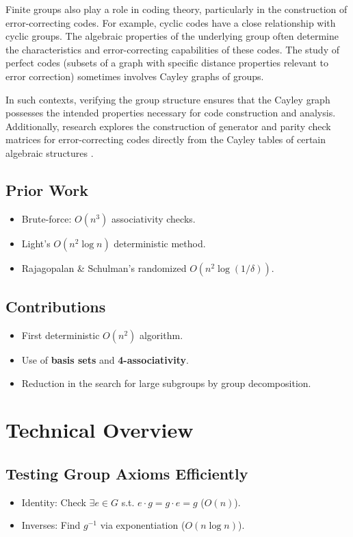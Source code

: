 \documentclass[sigconf]{acmart}
\begin{document}
Finite groups also play a role in coding theory, particularly in the construction of error-correcting codes. For example, cyclic codes have a close 
relationship with cyclic groups. The algebraic properties of the underlying group often determine the characteristics and error-correcting
capabilities of these codes. The study of perfect codes (subsets of a graph with specific distance properties relevant to error correction)
sometimes involves Cayley graphs of groups.

In such contexts, verifying the group structure ensures that the Cayley graph possesses
the intended properties necessary for code construction and analysis. Additionally, research explores the construction of generator
and parity check matrices for error-correcting codes directly from the Cayley tables of certain algebraic structures \cite{zurekCodingTheory}.

\subsection{Prior Work}
\begin{itemize}
    \item Brute-force: \( O(n^3) \) associativity checks.
    \item Light's \( O(n^2 \log n) \) deterministic method.
    \item Rajagopalan \& Schulman's randomized \( O(n^2 \log(1/\delta)) \).
\end{itemize}

\subsection{Contributions}
\begin{itemize}
    \item First deterministic \( O(n^2) \) algorithm.
    \item Use of \textbf{basis sets} and \textbf{4-associativity}.
    \item Reduction in the search for large subgroups by group decomposition.
\end{itemize}

\section{Technical Overview}
\subsection{Testing Group Axioms Efficiently}
\begin{itemize}
    \item Identity: Check \( \exists e \in G \) s.t. \( e \cdot g = g \cdot e = g \) (\( O(n) \)).
    \item Inverses: Find \( g^{-1} \) via exponentiation (\( O(n \log n) \)).
\end{itemize}
\end{document}
